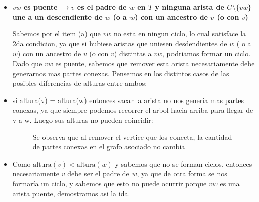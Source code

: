 \documentclass{article}
\begin{document}
\begin{itemize}

\item \textbf{$vw$ es puente $\rightarrow  v$ es el padre de $w$ en $T$ y ninguna arista de $G \setminus \{vw\}$ une a un descendiente de $w$ (o a $w$) con un ancestro de $v$ (o con $v$)}

Sabemos por el item (a) que $vw$ no esta en ningun ciclo, lo cual satisface la 2da condicion, ya que si hubiese aristas que uniesen desdendientes de $w$ ( o a $w$) con un ancestro de $v$ (o con $v$) distintas a $vw$, podriamos formar un ciclo. \\
Dado que $vw$ es puente, sabemos que remover esta arista necesariamente debe generarnos mas partes conexas. Pensemos en los distintos casos de las posibles diferencias de alturas entre ambos:

\item si altura(v) = altura(w) entonces sacar la arista no nos generia mas partes conexas, ya que siempre podemos recorrer el arbol hacia arriba para llegar de v a w. Luego sus alturas no pueden  coincidir:
\begin{figure}[h]
\begin{center}
\caption{Se observa que al remover el vertice que los conecta, la cantidad de partes conexas en el grafo asociado  no cambia}
\end{center}
\end{figure}

\item  Como $\text{altura}(v) < \text{altura}(w)$ y sabemos que no se forman ciclos, entonces necesariamente $v$ debe ser el padre de $w$, ya que de otra forma se nos formaría un ciclo, y sabemos que esto no puede ocurrir porque $vw$ es una arista puente, demostramos asi la ida.
\begin{figure}[h]
\centering
{}
\end{figure}
\end{itemize}
\end{document}
